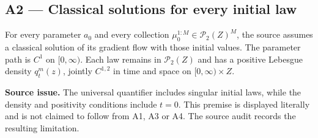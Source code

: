 \documentclass[11pt,a4paper]{report}
\begin{document}
\subsection{\texorpdfstring{A2 — Classical solutions for every initial law}{A2 — Classical solutions for every initial law}}



For every parameter \(a_0\) and every collection \(\mu_0^{1:M}\in\mathcal P_2(Z)^M\), the source assumes a classical solution of its gradient flow with those initial values. The parameter path is \(C^1\) on \([0,\infty)\). Each law remains in \(\mathcal P_2(Z)\) and has a positive Lebesgue density \(q_t^m(z)\), jointly \(C^{1,2}\) in time and space on \([0,\infty)\times Z\).




\textbf{Source issue.} The universal quantifier includes singular initial laws, while the density and positivity conditions include \(t=0\). This premise is displayed literally and is not claimed to follow from A1, A3 or A4. The source audit records the resulting limitation.
\end{document}

